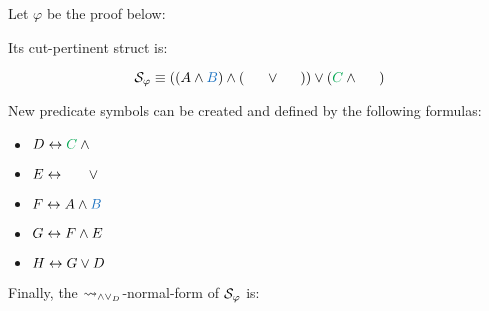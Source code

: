 \documentclass{llncs}
\begin{document}
\begin{example}
\label{example:PlusTimesDefinitionalNormalization}


Let $\varphi$ be the proof below:

\begin{prooftree}
		 
	 
						 
					 
					 
									 
								 
\end{prooftree}

Its cut-pertinent struct is:

$$
\cutpertstruct{\varphi} 
\equiv 
((\hA{A} \structplus \hB{B}) \structplus (\hC{\structdual{B}} \structtimes \hD{\structdual{A}}))
\structtimes
(\hE{C} \structplus \hF{\structdual{C}})
$$

New predicate symbols can be created and defined by the following formulas: 

\begin{itemize}
\item $D \biimp \hE{C} \structplus \hF{\structdual{C}}$

\item $E \biimp \hC{\structdual{B}} \structtimes \hD{\structdual{A}}$

\item $F \biimp \hA{A} \structplus \hB{B}$

\item $G \biimp F \structplus E$

\item $H \biimp G \structtimes D$
\end{itemize}

Finally, the $\normalizePlusTimesD$-normal-form of $\cutpertstruct{\varphi}$ is:


\end{example}
\end{document}
